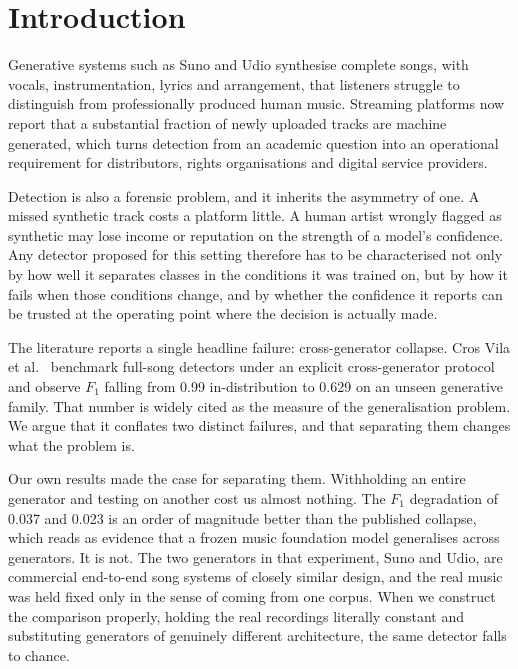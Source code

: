 \section{Introduction}
\label{sec:introduction}

Generative systems such as Suno and Udio synthesise complete songs, with vocals,
instrumentation, lyrics and arrangement, that listeners struggle to
distinguish from professionally produced human music. Streaming platforms now
report that a substantial fraction of newly uploaded tracks are machine
generated, which turns detection from an academic question into an operational
requirement for distributors, rights organisations and digital service
providers.

Detection is also a forensic problem, and it inherits the asymmetry of one. A
missed synthetic track costs a platform little. A human artist wrongly flagged
as synthetic may lose income or reputation on the strength of a model's
confidence. Any detector proposed for this setting therefore has to be
characterised not only by how well it separates classes in the conditions it was
trained on, but by how it fails when those conditions change, and by whether the
confidence it reports can be trusted at the operating point where the decision
is actually made.

The literature reports a single headline failure: cross-generator collapse.
Cros Vila et al.~\cite{crosvila2025} benchmark full-song detectors under an
explicit cross-generator protocol and observe $F_1$ falling from 0.99
in-distribution to 0.629 on an unseen generative family. That number is widely
cited as the measure of the generalisation problem. We argue that it conflates
two distinct failures, and that separating them changes what the problem is.

Our own results made the case for separating them. Withholding an entire
generator and testing on another cost us almost nothing. The $F_1$ degradation
of 0.037 and 0.023 is an order of magnitude better than the published collapse,
which reads as evidence that a frozen music foundation model generalises across
generators. It is not. The two generators in that experiment, Suno and Udio, are
commercial end-to-end song systems of closely similar design, and the real music
was held fixed only in the sense of coming from one corpus. When we construct
the comparison properly, holding the real recordings literally constant and
substituting generators of genuinely different architecture, the same detector
falls to chance.


